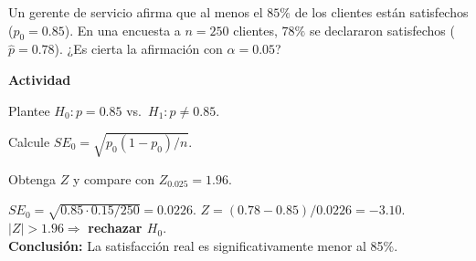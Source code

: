 \begin{ejercicio}[Satisfacción de clientes (n=250)]
Un gerente de servicio afirma que al menos el $85\%$ de los clientes están satisfechos ($p_0=0.85$).
En una encuesta a $n=250$ clientes, $78\%$ se declararon satisfechos ($\hat p=0.78$).
¿Es cierta la afirmación con $\alpha=0.05$?


\textbf{Actividad}
\begin{pasos}
  \item Plantee $H_0: p=0.85$ vs.\ $H_1: p\neq0.85$.
  \item Calcule $SE_0=\sqrt{p_0(1-p_0)/n}$.
  \item Obtenga $Z$ y compare con $Z_{0.025}=1.96$.
\end{pasos}

\begin{clave}
$SE_0=\sqrt{0.85\cdot0.15/250}=0.0226$. \;
$Z=(0.78-0.85)/0.0226=-3.10$. \;
$|Z|>1.96 \Rightarrow$ \textbf{rechazar $H_0$}.\\
\textbf{Conclusión:} La satisfacción real es significativamente menor al 85\%.
\end{clave}
\end{ejercicio}